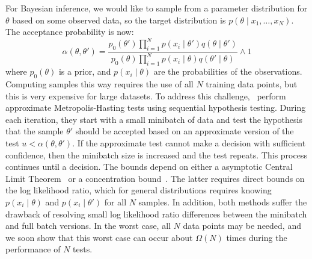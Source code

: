 \documentclass{article}
\begin{document}
For Bayesian inference, we would like to sample from a parameter distribution
for $\theta$ based on some observed data, so the target distribution is
$p(\theta \mid x_1, \ldots, x_N)$. The acceptance probability is now:
\begin{equation}\label{eq:acceptance_probability}
    \alpha(\theta,\theta') = 
    \frac{p_0(\theta')\prod_{i=1}^N p(x_i \mid \theta')q(\theta \mid
    \theta')}{p_0(\theta)\prod_{i=1}^N p(x_i \mid \theta)q(\theta' \mid\theta)}
    \wedge 1
\end{equation}
where $p_0(\theta)$ is a prior, and $p(x_i \mid \theta)$ are the probabilities
of the observations. Computing samples this way requires the use of all $N$
training data points, but this is very expensive for large datasets. To address
this challenge,~\cite{cutting_mh_2014,icml2014c1_bardenet14} perform approximate
Metropolis-Hasting tests using sequential hypothesis testing. During each
iteration, they start with a small minibatch of data and test the hypothesis
that the sample $\theta'$ should be accepted based on an approximate version of
the test $u < \alpha(\theta,\theta')$. If the approximate test cannot make a
decision with sufficient confidence, then the minibatch size is increased and
the test repeats. This process continues until a decision. The bounds depend on
either a asymptotic Central Limit Theorem~\cite{cutting_mh_2014} or a
concentration bound~\cite{icml2014c1_bardenet14}. The latter requires direct
bounds on the log likelihood ratio, which for general distributions requires
knowing $p(x_i \mid \theta)$ and $p(x_i \mid \theta')$ for all $N$ samples. In
addition, both methods suffer the drawback of resolving small log likelihood
ratio differences between the minibatch and full batch versions.  In the worst
case, all $N$ data points may be needed, and we soon show that this worst case
can occur about $\Omega(N)$ times during the performance of $N$ tests.
\end{document}
